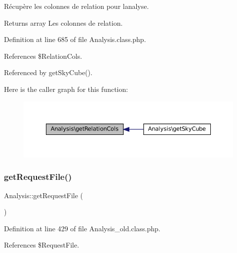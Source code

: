 Récupère les colonnes de relation pour l\textquotesingle{}analyse.

\begin{DoxyReturn}{Returns}
array Les colonnes de relation. 
\end{DoxyReturn}


Definition at line 685 of file Analysis.\+class.\+php.



References \$\+Relation\+Cols.



Referenced by get\+Sky\+Cube().

Here is the caller graph for this function\+:\nopagebreak
\begin{figure}[H]
\begin{center}
\leavevmode
\includegraphics[width=350pt]{class_analysis_a90b84a8fb6cf7b7dbd06ce835300e69c_icgraph}
\end{center}
\end{figure}
\mbox{\label{class_analysis_a162e4c51057c935b438264abe15feb24}} 
\subsubsection{\texorpdfstring{get\+Request\+File()}{getRequestFile()}\hspace{0.1cm}{\footnotesize\ttfamily [1/2]}}
{\footnotesize\ttfamily Analysis\+::get\+Request\+File (\begin{DoxyParamCaption}{ }\end{DoxyParamCaption})}



Definition at line 429 of file Analysis\+\_\+old.\+class.\+php.



References \$\+Request\+File.

\mbox{\label{class_analysis_a162e4c51057c935b438264abe15feb24}} 
